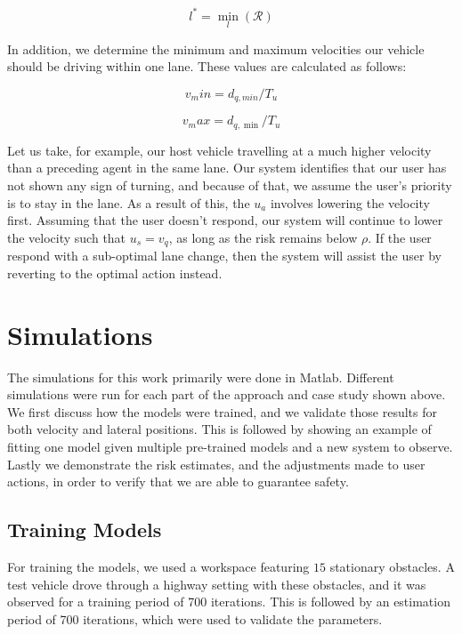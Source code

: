 \documentclass[conference]{IEEEtran}
\begin{document}
\begin{equation}
    l^* = \min_l(\mathcal{R})
\end{equation}

In addition, we determine the minimum and maximum velocities our vehicle should be driving within one lane. These values are calculated as follows:

\begin{equation}
    v_min = d_{q,min}/T_u
\end{equation}

\begin{equation}
    v_max = d_{q,\min}/T_u
\end{equation}

 Let us take, for example, our host vehicle travelling at a much higher velocity than a preceding agent in the same lane. Our system identifies that our user has not shown any sign of turning, and because of that, we assume the user's priority is to stay in the lane. As a result of this, the $u_a$ involves lowering the velocity first. Assuming that the user doesn't respond, our system will continue to lower the velocity such that $u_s = v_q$, as long as the risk remains below $\rho$. If the user respond with a sub-optimal lane change, then the system will assist the user by reverting to the optimal action instead.  


\section{Simulations}
The simulations for this work primarily were done in Matlab. Different simulations were run for each part of the approach and case study shown above. We first discuss how the models were trained, and we validate those results for both velocity and lateral positions. This is followed by showing an example of fitting one model given multiple pre-trained models and a new system to observe. Lastly we demonstrate the risk estimates, and the adjustments made to user actions, in order to verify that we are able to guarantee safety.

\subsection{Training Models}
For training the models, we used a workspace featuring $15$ stationary obstacles. A test vehicle drove through a highway setting with these obstacles, and it was observed for a training period of 700 iterations. This is followed by an estimation period of 700 iterations, which were used to validate the parameters.
\end{document}
